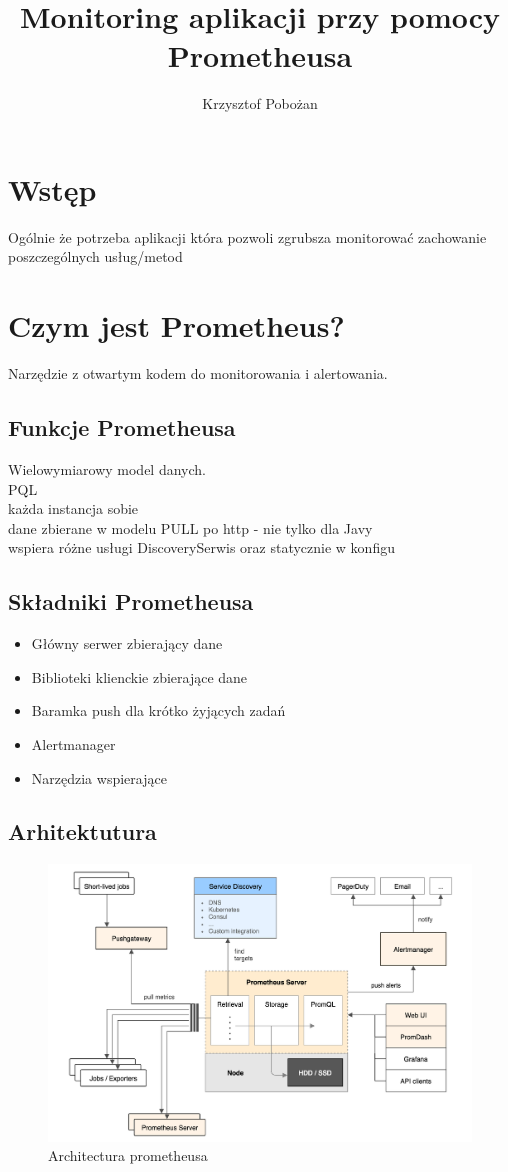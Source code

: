 \documentclass[12pt,a4paper,notitlepage,onecolumn]{article}
\author{Krzysztof Pobożan}
\title{Monitoring aplikacji przy pomocy Prometheusa}
\begin{document}
	\maketitle
	\section{Wstęp}
	Ogólnie że potrzeba aplikacji która pozwoli zgrubsza monitorować zachowanie poszczególnych usług/metod
	\section{Czym jest Prometheus?}
	Narzędzie z otwartym kodem do monitorowania i alertowania.
	\subsection{Funkcje Prometheusa}
	Wielowymiarowy model danych.\\
	PQL\\
	każda instancja sobie\\
	dane zbierane w modelu PULL po http - nie tylko dla Javy\\
	wspiera różne usługi DiscoverySerwis oraz statycznie  w konfigu
	\subsection{Składniki Prometheusa}
\begin{itemize}
	\item Główny serwer zbierający dane
	\item Biblioteki klienckie zbierające dane
	\item Baramka push dla krótko żyjących zadań
	\item Alertmanager
	\item Narzędzia wspierające
\end{itemize}
	\subsection{Arhitektutura}
	\begin{figure}
\centering
\includegraphics[width=0.7\linewidth]{architecture}
\caption{Architectura prometheusa}
\label{fig:architecture}
\end{figure}
\end{document}
